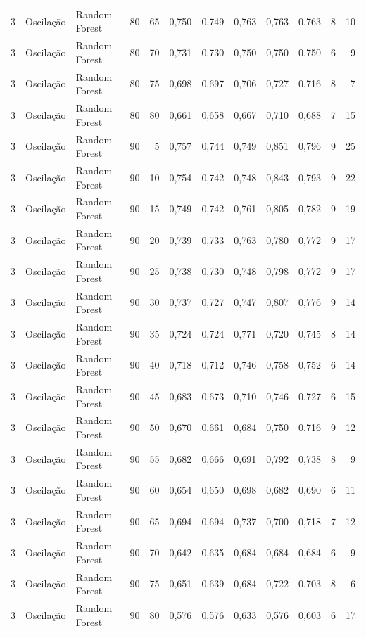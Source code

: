 \begin{longtable}{@{}rllrrrrrrrrr@{}}
3 & Oscilação & Random Forest & 80 & 65 & 0,750 & 0,749 & 0,763 & 0,763 & 0,763 & 8 & 10 \\
3 & Oscilação & Random Forest & 80 & 70 & 0,731 & 0,730 & 0,750 & 0,750 & 0,750 & 6 & 9 \\
3 & Oscilação & Random Forest & 80 & 75 & 0,698 & 0,697 & 0,706 & 0,727 & 0,716 & 8 & 7 \\
3 & Oscilação & Random Forest & 80 & 80 & 0,661 & 0,658 & 0,667 & 0,710 & 0,688 & 7 & 15 \\
3 & Oscilação & Random Forest & 90 & 5 & 0,757 & 0,744 & 0,749 & 0,851 & 0,796 & 9 & 25 \\
3 & Oscilação & Random Forest & 90 & 10 & 0,754 & 0,742 & 0,748 & 0,843 & 0,793 & 9 & 22 \\
3 & Oscilação & Random Forest & 90 & 15 & 0,749 & 0,742 & 0,761 & 0,805 & 0,782 & 9 & 19 \\
3 & Oscilação & Random Forest & 90 & 20 & 0,739 & 0,733 & 0,763 & 0,780 & 0,772 & 9 & 17 \\
3 & Oscilação & Random Forest & 90 & 25 & 0,738 & 0,730 & 0,748 & 0,798 & 0,772 & 9 & 17 \\
3 & Oscilação & Random Forest & 90 & 30 & 0,737 & 0,727 & 0,747 & 0,807 & 0,776 & 9 & 14 \\
3 & Oscilação & Random Forest & 90 & 35 & 0,724 & 0,724 & 0,771 & 0,720 & 0,745 & 8 & 14 \\
3 & Oscilação & Random Forest & 90 & 40 & 0,718 & 0,712 & 0,746 & 0,758 & 0,752 & 6 & 14 \\
3 & Oscilação & Random Forest & 90 & 45 & 0,683 & 0,673 & 0,710 & 0,746 & 0,727 & 6 & 15 \\
3 & Oscilação & Random Forest & 90 & 50 & 0,670 & 0,661 & 0,684 & 0,750 & 0,716 & 9 & 12 \\
3 & Oscilação & Random Forest & 90 & 55 & 0,682 & 0,666 & 0,691 & 0,792 & 0,738 & 8 & 9 \\
3 & Oscilação & Random Forest & 90 & 60 & 0,654 & 0,650 & 0,698 & 0,682 & 0,690 & 6 & 11 \\
3 & Oscilação & Random Forest & 90 & 65 & 0,694 & 0,694 & 0,737 & 0,700 & 0,718 & 7 & 12 \\
3 & Oscilação & Random Forest & 90 & 70 & 0,642 & 0,635 & 0,684 & 0,684 & 0,684 & 6 & 9 \\
3 & Oscilação & Random Forest & 90 & 75 & 0,651 & 0,639 & 0,684 & 0,722 & 0,703 & 8 & 6 \\
3 & Oscilação & Random Forest & 90 & 80 & 0,576 & 0,576 & 0,633 & 0,576 & 0,603 & 6 & 17 \\

\end{longtable}

